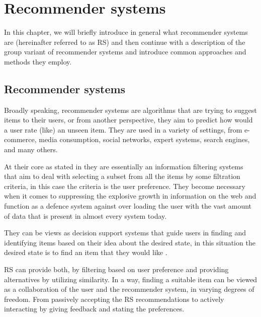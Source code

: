 
\chapter{Recommender systems} \label{chap_recommender_systems}
In this chapter, we will briefly introduce in general what recommender systems are (hereinafter referred to as RS) and then continue with a description of the group variant of recommender systems and introduce common approaches and methods they employ.


\section{Recommender systems}
Broadly speaking, recommender systems are algorithms that are trying to suggest items to their users, or from another perspective, they aim to predict how would a user rate (like) an unseen item. They are used in a variety of settings, from e-commerce, media consumption, social networks, expert systems, search engines, and many others.

At their core as stated in \cite{wiki:Recommender_system} they are essentially an information filtering systems that aim to deal with selecting a subset from all the items by some filtration criteria, in this case the criteria is the user preference. They become necessary when it comes to suppressing the explosive growth in information on the web and function as a defence system against over loading the user with the vast amount of data that is present in almost every system today.

They can be views as decision support systems that guide users in finding and identifying items based on their idea about the desired state, in this situation the desired state is to find an item that they would like \cite{grouprecommendersystems_felfernig2018group}.

RS can provide both, by filtering based on user preference and providing alternatives by utilizing similarity. In a way, finding a suitable item can be viewed as a collaboration of the user and the recommender system, in varying degrees of freedom. From passively accepting the RS recommendations to actively interacting by giving feedback and stating the preferences.

